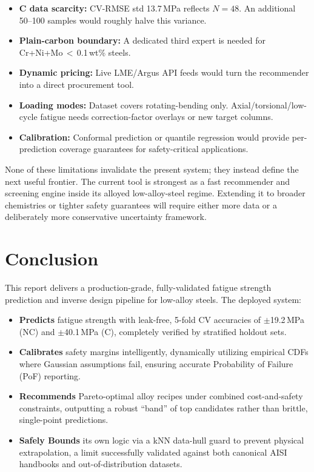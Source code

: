 \documentclass[12pt,a4paper]{article} %
\begin{document}
\begin{itemize}
  \item \textbf{C data scarcity:} CV-RMSE std 13.7\,MPa reflects $N=48$. An additional 50--100 samples would roughly halve this variance.
  \item \textbf{Plain-carbon boundary:} A dedicated third expert is needed for Cr+Ni+Mo\,$<$\,0.1\,wt\% steels.
  \item \textbf{Dynamic pricing:} Live LME/Argus API feeds would turn the recommender into a direct procurement tool.
  \item \textbf{Loading modes:} Dataset covers rotating-bending only. Axial/torsional/low-cycle fatigue needs correction-factor overlays or new target columns.
  \item \textbf{Calibration:} Conformal prediction or quantile regression would provide per-prediction coverage guarantees for safety-critical applications.
\end{itemize}
None of these limitations invalidate the present system; they instead define the next
useful frontier. The current tool is strongest as a fast recommender and screening engine
inside its alloyed low-alloy-steel regime. Extending it to broader chemistries or tighter
safety guarantees will require either more data or a deliberately more conservative
uncertainty framework.

\section{Conclusion}

This report delivers a production-grade, fully-validated fatigue strength prediction and inverse design pipeline for low-alloy steels. The deployed system:

\begin{itemize}
  \item \textbf{Predicts} fatigue strength with leak-free, 5-fold CV accuracies of $\pm$19.2\,MPa (NC) and $\pm$40.1\,MPa (C), completely verified by stratified holdout sets.
  \item \textbf{Calibrates} safety margins intelligently, dynamically utilizing empirical CDFs where Gaussian assumptions fail, ensuring accurate Probability of Failure (PoF) reporting.
  \item \textbf{Recommends} Pareto-optimal alloy recipes under combined cost-and-safety constraints, outputting a robust ``band'' of top candidates rather than brittle, single-point predictions.
  \item \textbf{Safely Bounds} its own logic via a kNN data-hull guard to prevent physical extrapolation, a limit successfully validated against both canonical AISI handbooks and out-of-distribution datasets.
\end{itemize}
\end{document}
